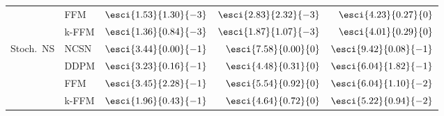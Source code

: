 \begin{table}[t]
{\begin{tabular}{llrrr}
 & FFM
 & \textcolor{Orange}{\textbf{$\esci{1.53}{1.30}{-3}$}}
 & $\esci{2.83}{2.32}{-3}$
 & $\esci{4.23}{0.27}{0}$ \\
 & k-FFM
 & \cellcolor[gray]{0.9}\textcolor{ForestGreen}{\textbf{$\esci{1.36}{0.84}{-3}$}}
 & \cellcolor[gray]{0.9}\textcolor{ForestGreen}{\textbf{$\esci{1.87}{1.07}{-3}$}}
 & \cellcolor[gray]{0.9}\textcolor{Orange}{\textbf{$\esci{4.01}{0.29}{0}$}} \\
\midrule
\multirow{4}{*}{Stoch.\ NS}
 & NCSN
 & $\esci{3.44}{0.00}{-1}$
 & $\esci{7.58}{0.00}{0}$
 & $\esci{9.42}{0.08}{-1}$ \\
 & DDPM
 & \textcolor{Orange}{\textbf{$\esci{3.23}{0.16}{-1}$}}
 & \textcolor{ForestGreen}{\textbf{$\esci{4.48}{0.31}{0}$}}
 & $\esci{6.04}{1.82}{-1}$ \\
 & FFM
 & $\esci{3.45}{2.28}{-1}$
 & $\esci{5.54}{0.92}{0}$
 & \textcolor{Orange}{\textbf{$\esci{6.04}{1.10}{-2}$}} \\
 & k-FFM
 & \cellcolor[gray]{0.9}\textcolor{ForestGreen}{\textbf{$\esci{1.96}{0.43}{-1}$}}
 & \cellcolor[gray]{0.9}\textcolor{Orange}{\textbf{$\esci{4.64}{0.72}{0}$}}
 & \cellcolor[gray]{0.9}\textcolor{ForestGreen}{\textbf{$\esci{5.22}{0.94}{-2}$}} \\
\bottomrule
\end{tabular}
} %
\end{table}